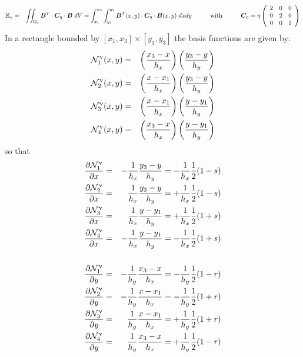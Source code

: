 \begin{eqnarray}
{\mathbb{K}}_e 
&=& \iint_{\Omega_e} {\bm B}^T \cdot {\bm C}_\eta \cdot {\bm B} \; dV 
= \int_{x_1}^{x_3}\int_{y_1}^{y_3} 
{\bm B}^T(x,y) \cdot {\bm C}_\eta \cdot {\bm B}(x,y) \; dx dy 
\quad \qquad\text{with}\qquad \quad
{\bm C}_\eta = \eta \left(\begin{array}{ccc}
2 &0 &0\\
0 &2 &0\\
0 &0 &1 
\end{array}\right) \nonumber
\end{eqnarray}
In a rectangle bounded by $[x_1,x_3]\times[y_1,y_3]$ the basis functions are given by:
\begin{eqnarray}
{{\mathcal{N}}}_1^\upnu(x,y) &=& \left( \frac{x_3 -x }{h_x}  \right) \left( \frac{y_3 -y }{h_y}  \right) \nonumber\\
{{\mathcal{N}}}_2^\upnu(x,y) &=& \left( \frac{x - x_1}{h_x}  \right) \left( \frac{y_3 -y }{h_y}  \right) \nonumber\\
{{\mathcal{N}}}_3^\upnu(x,y) &=& \left( \frac{x - x_1}{h_x}  \right) \left( \frac{y - y_1}{h_y}  \right) \nonumber\\
{{\mathcal{N}}}_4^\upnu(x,y) &=& \left( \frac{x_3 -x }{h_x}  \right) \left( \frac{y - y_1}{h_y}  \right) \nonumber 
\end{eqnarray}
so that 
\begin{eqnarray}
\frac{\partial {\mathcal{N}}_1^\upnu}{\partial x} &=&-\frac{1}{h_x}\frac{y_3-y}{h_y}=-\frac{1}{h_x}\frac12 (1-s)\nonumber\\
\frac{\partial {\mathcal{N}}_2^\upnu}{\partial x} &=& \frac{1}{h_x}\frac{y_3-y}{h_y}=+\frac{1}{h_x}\frac12 (1-s)\nonumber\\
\frac{\partial {\mathcal{N}}_3^\upnu}{\partial x} &=& \frac{1}{h_x}\frac{y-y_1}{h_y}=+\frac{1}{h_x}\frac12 (1+s)\nonumber\\
\frac{\partial {\mathcal{N}}_4^\upnu}{\partial x} &=&-\frac{1}{h_x}\frac{y-y_1}{h_y}=-\frac{1}{h_x}\frac12 (1+s)\nonumber\\
\nonumber\\
\frac{\partial {\mathcal{N}}_1^\upnu}{\partial y} &=&-\frac{1}{h_y}\frac{x_3-x}{h_x}=-\frac{1}{h_y}\frac12 (1-r)\nonumber\\
\frac{\partial {\mathcal{N}}_2^\upnu}{\partial y} &=&-\frac{1}{h_y}\frac{x-x_1}{h_x}=-\frac{1}{h_y}\frac12 (1+r)\nonumber\\
\frac{\partial {\mathcal{N}}_3^\upnu}{\partial y} &=& \frac{1}{h_y}\frac{x-x_1}{h_x}=+\frac{1}{h_y}\frac12 (1+r)\nonumber\\
\frac{\partial {\mathcal{N}}_4^\upnu}{\partial y} &=& \frac{1}{h_y}\frac{x_3-x}{h_x}=+\frac{1}{h_y}\frac12 (1-r)
\nonumber
\end{eqnarray}

